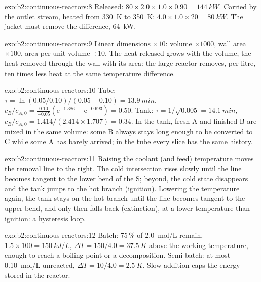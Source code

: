 \begin{solution}{exo:b2:continuous-reactors:8}
Released: $80 \times 2.0 \times 1.0 \times 0.90 = \qty{144}{kW}$. Carried by the
outlet stream, heated from \qty{330}{K} to \qty{350}{K}: $4.0 \times 1.0 \times 20 =
\qty{80}{kW}$. The jacket must remove the difference, \qty{64}{kW}.
\end{solution}

\begin{solution}{exo:b2:continuous-reactors:9}
Linear dimensions $\times 10$: volume $\times 1000$, wall area $\times 100$, area
per unit volume $\div 10$. The heat released grows with the volume, the heat
removed through the wall with its area: the large reactor removes, per litre,
ten times less heat at the same temperature difference.
\end{solution}

\begin{solution}{exo:b2:continuous-reactors:10}
Tube: $\tau = \ln(0.05/0.10)/(0.05 - 0.10) = \qty{13.9}{min}$, $c_B/c_{A,0} =
\frac{0.10}{-0.05}(\mathrm e^{-1.386} - \mathrm e^{-0.693}) = 0.50$. Tank: $\tau =
1/\sqrt{0.005} = \qty{14.1}{min}$, $c_B/c_{A,0} = 1.414/(2.414 \times 1.707) =
0.34$. In the tank, fresh A and finished B are mixed in the same volume: some
B always stays long enough to be converted to C while some A has barely
arrived; in the tube every slice has the same history.
\end{solution}

\begin{solution}{exo:b2:continuous-reactors:11}
Raising the coolant (and feed) temperature moves the removal line to the
right. The cold intersection rises slowly until the line becomes tangent to
the lower bend of the S; beyond, the cold state disappears and the tank jumps
to the hot branch (ignition). Lowering the temperature again, the tank stays
on the hot branch until the line becomes tangent to the upper bend, and only
then falls back (extinction), at a lower temperature than ignition: a
hysteresis loop.
\end{solution}

\begin{solution}{exo:b2:continuous-reactors:12}
Batch: 75\,\% of \qty{2.0}{mol/L} remain, $1.5 \times 100 = \qty{150}{kJ/L}$,
$\Delta T = 150/4.0 = \qty{37.5}{K}$ above the working temperature, enough to
reach a boiling point or a decomposition. Semi-batch: at most
\qty{0.10}{mol/L} unreacted, $\Delta T = 10/4.0 = \qty{2.5}{K}$. Slow addition
caps the energy stored in the reactor.
\end{solution}

